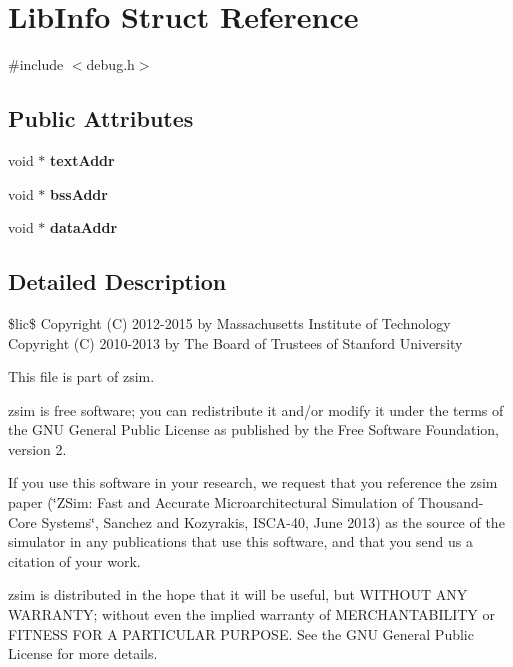 \hypertarget{structLibInfo}{\section{Lib\-Info Struct Reference}
\label{structLibInfo}
}


{\ttfamily \#include $<$debug.\-h$>$}

\subsection*{Public Attributes}
\begin{DoxyCompactItemize}
\item 
\hypertarget{structLibInfo_a573bbdcfaf29366ef16a9ee9cf77ba82}{void $\ast$ {\bfseries text\-Addr}}\label{structLibInfo_a573bbdcfaf29366ef16a9ee9cf77ba82}

\item 
\hypertarget{structLibInfo_ab293b6055f594c556480666cf19dfddb}{void $\ast$ {\bfseries bss\-Addr}}\label{structLibInfo_ab293b6055f594c556480666cf19dfddb}

\item 
\hypertarget{structLibInfo_a0cec672450c8112cca9690af21dcad28}{void $\ast$ {\bfseries data\-Addr}}\label{structLibInfo_a0cec672450c8112cca9690af21dcad28}

\end{DoxyCompactItemize}


\subsection{Detailed Description}
\$lic\$ Copyright (C) 2012-\/2015 by Massachusetts Institute of Technology Copyright (C) 2010-\/2013 by The Board of Trustees of Stanford University

This file is part of zsim.

zsim is free software; you can redistribute it and/or modify it under the terms of the G\-N\-U General Public License as published by the Free Software Foundation, version 2.

If you use this software in your research, we request that you reference the zsim paper (\char`\"{}\-Z\-Sim\-: Fast and Accurate Microarchitectural Simulation of
\-Thousand-\/\-Core Systems\char`\"{}, Sanchez and Kozyrakis, I\-S\-C\-A-\/40, June 2013) as the source of the simulator in any publications that use this software, and that you send us a citation of your work.

zsim is distributed in the hope that it will be useful, but W\-I\-T\-H\-O\-U\-T A\-N\-Y W\-A\-R\-R\-A\-N\-T\-Y; without even the implied warranty of M\-E\-R\-C\-H\-A\-N\-T\-A\-B\-I\-L\-I\-T\-Y or F\-I\-T\-N\-E\-S\-S F\-O\-R A P\-A\-R\-T\-I\-C\-U\-L\-A\-R P\-U\-R\-P\-O\-S\-E. See the G\-N\-U General Public License for more details.

